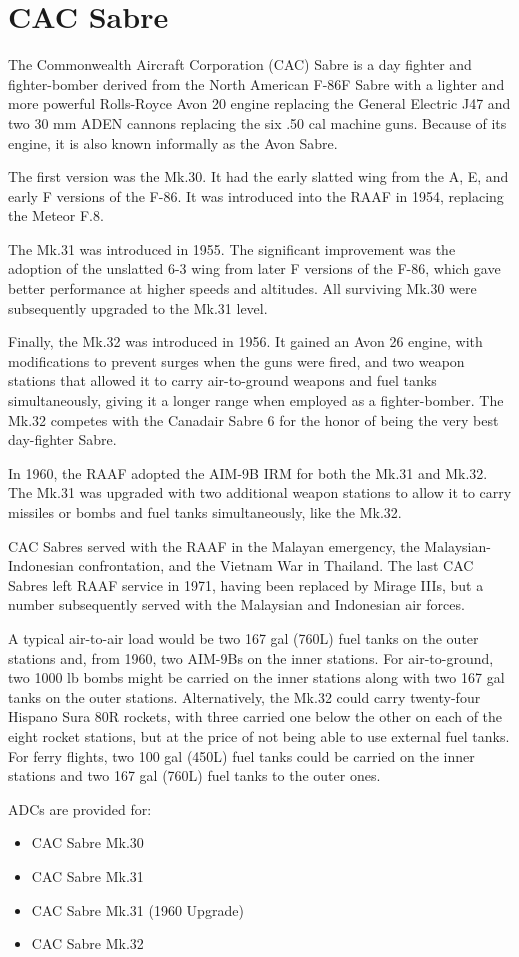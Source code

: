 \section*{CAC Sabre}

The Commonwealth Aircraft Corporation (CAC) Sabre is a day fighter and fighter-bomber derived from the North American F-86F Sabre with a lighter and more powerful Rolls-Royce Avon 20 engine replacing the General Electric J47 and two 30 mm ADEN cannons replacing the six .50 cal machine guns. Because of its engine, it is also known informally as the Avon Sabre. 

The first version was the Mk.30. It had the early slatted wing from the A, E, and early F versions of the F-86. It was introduced into the RAAF in 1954, replacing the Meteor F.8.

The Mk.31 was introduced in 1955. The significant improvement was the adoption of the unslatted 6-3 wing from later F versions of the F-86, which gave better performance at higher speeds and altitudes. All surviving Mk.30 were subsequently upgraded to the Mk.31 level. 

Finally, the Mk.32 was introduced in 1956. It gained an Avon 26 engine, with modifications to prevent surges when the guns were fired, and two weapon stations that allowed it to carry air-to-ground weapons and fuel tanks simultaneously, giving it a longer range when employed as a fighter-bomber. The Mk.32 competes with the Canadair Sabre 6 for the honor of being the very best day-fighter Sabre.

In 1960, the RAAF adopted the AIM-9B IRM for both the Mk.31 and Mk.32. The Mk.31 was upgraded with two additional weapon stations to allow it to carry missiles or bombs and fuel tanks simultaneously, like the Mk.32.

CAC Sabres served with the RAAF in the Malayan emergency, the Malaysian-Indonesian confrontation, and the Vietnam War in Thailand. The last CAC Sabres left RAAF service in 1971, having been replaced by Mirage IIIs, but a number subsequently served with the Malaysian and Indonesian air forces.

A typical air-to-air load would be two 167 gal (760L) fuel tanks on the outer stations and, from 1960, two AIM-9Bs on the inner stations. For air-to-ground, two 1000 lb bombs might be carried on the inner stations along with two 167 gal tanks on the outer stations. Alternatively, the Mk.32 could carry twenty-four Hispano Sura 80R rockets, with three carried one below the other on each of the eight rocket stations, but at the price of not being able to use external fuel tanks. For ferry flights, two 100 gal (450L) fuel tanks could be carried on the inner stations and two 167 gal (760L) fuel tanks to the outer ones.

ADCs are provided for:
\begin{itemize}
\item CAC Sabre Mk.30
\item CAC Sabre Mk.31
\item CAC Sabre Mk.31 (1960 Upgrade)
\item CAC Sabre Mk.32
\end{itemize}
